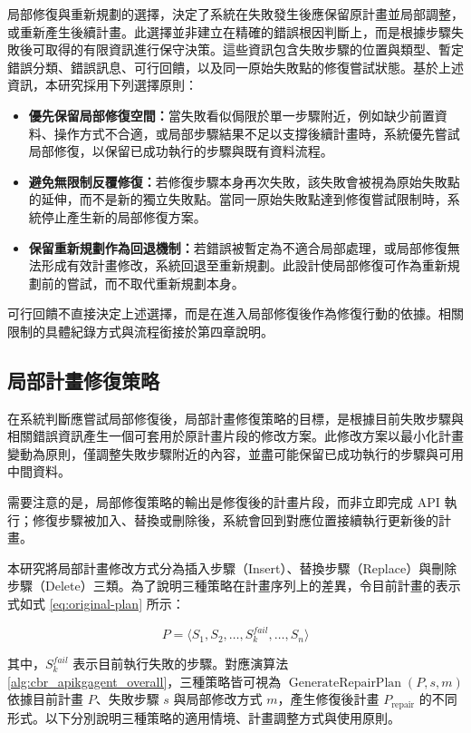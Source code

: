 \begin{ZhChapter}
局部修復與重新規劃的選擇，決定了系統在失敗發生後應保留原計畫並局部調整，或重新產生後續計畫。此選擇並非建立在精確的錯誤根因判斷上，而是根據步驟失敗後可取得的有限資訊進行保守決策。這些資訊包含失敗步驟的位置與類型、暫定錯誤分類、錯誤訊息、可行回饋，以及同一原始失敗點的修復嘗試狀態。基於上述資訊，本研究採用下列選擇原則：

\begin{itemize}
    \item \textbf{優先保留局部修復空間：}當失敗看似侷限於單一步驟附近，例如缺少前置資料、操作方式不合適，或局部步驟結果不足以支撐後續計畫時，系統優先嘗試局部修復，以保留已成功執行的步驟與既有資料流程。
    \item \textbf{避免無限制反覆修復：}若修復步驟本身再次失敗，該失敗會被視為原始失敗點的延伸，而不是新的獨立失敗點。當同一原始失敗點達到修復嘗試限制時，系統停止產生新的局部修復方案。
    \item \textbf{保留重新規劃作為回退機制：}若錯誤被暫定為不適合局部處理，或局部修復無法形成有效計畫修改，系統回退至重新規劃。此設計使局部修復可作為重新規劃前的嘗試，而不取代重新規劃本身。
\end{itemize}

可行回饋不直接決定上述選擇，而是在進入局部修復後作為修復行動的依據。相關限制的具體紀錄方式與流程銜接於第四章說明。

\subsection{局部計畫修復策略}

在系統判斷應嘗試局部修復後，局部計畫修復策略的目標，是根據目前失敗步驟與相關錯誤資訊產生一個可套用於原計畫片段的修改方案。此修改方案以最小化計畫變動為原則，僅調整失敗步驟附近的內容，並盡可能保留已成功執行的步驟與可用中間資料。

需要注意的是，局部修復策略的輸出是修復後的計畫片段，而非立即完成 API 執行；修復步驟被加入、替換或刪除後，系統會回到對應位置接續執行更新後的計畫。

本研究將局部計畫修改方式分為插入步驟（Insert）、替換步驟（Replace）與刪除步驟（Delete）三類。為了說明三種策略在計畫序列上的差異，令目前計畫的表示式如式 \ref{eq:original-plan} 所示：

\begin{equation}
P = \langle S_1, S_2, \ldots, S_k^{fail}, \ldots, S_n \rangle
\label{eq:original-plan}
\end{equation}

其中，\(S_k^{fail}\) 表示目前執行失敗的步驟。對應演算法 \ref{alg:cbr_apikgagent_overall}，三種策略皆可視為 \(\operatorname{GenerateRepairPlan}(P, s, m)\) 依據目前計畫 \(P\)、失敗步驟 \(s\) 與局部修改方式 \(m\)，產生修復後計畫 \(P_{\mathrm{repair}}\) 的不同形式。以下分別說明三種策略的適用情境、計畫調整方式與使用原則。


\end{ZhChapter}
